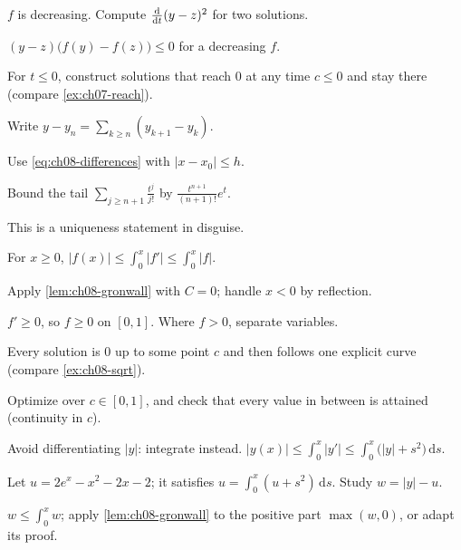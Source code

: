 \begin{hintlevels}
  \item $f$ is decreasing. Compute $\frac{\mathrm{d}}{\mathrm{d}t}(y - z)^2$ for two solutions.
  \item $(y - z)\bigl(f(y) - f(z)\bigr)\le0$ for a decreasing $f$.
  \item For $t\le0$, construct solutions that reach $0$ at any time $c\le 0$
        and stay there (compare \cref{ex:ch07-reach}).
\end{hintlevels}

\begin{hintlevels}
  \item Write $y - y_n = \sum_{k\ge n}(y_{k+1} - y_k)$.
  \item Use \eqref{eq:ch08-differences} with $|x - x_0|\le h$.
  \item Bound the tail $\sum_{j\ge n+1}\frac{t^j}{j!}$ by
        $\frac{t^{n+1}}{(n+1)!}e^t$.
\end{hintlevels}

\begin{hintlevels}
  \item This is a uniqueness statement in disguise.
  \item For $x\ge0$, $|f(x)|\le\int_0^x|f'|\le\int_0^x|f|$.
  \item Apply \cref{lem:ch08-gronwall} with $C = 0$; handle $x<0$ by reflection.
\end{hintlevels}

\begin{hintlevels}
  \item $f'\ge0$, so $f\ge0$ on $[0,1]$. Where $f>0$, separate variables.
  \item Every solution is $0$ up to some point $c$ and then follows one explicit
        curve (compare \cref{ex:ch08-sqrt}).
  \item Optimize over $c\in[0,1]$, and check that every value in between is
        attained (continuity in $c$).
\end{hintlevels}

\begin{hintlevels}
  \item Avoid differentiating $|y|$: integrate instead.
        $|y(x)|\le\int_0^x|y'|\le\int_0^x\bigl(|y| + s^2\bigr)\,\mathrm{d}s$.
  \item Let $u = 2e^x - x^2 - 2x - 2$; it satisfies $u = \int_0^x(u + s^2)\,\mathrm{d}s$.
        Study $w = |y| - u$.
  \item $w\le\int_0^xw$; apply \cref{lem:ch08-gronwall} to the positive part
        $\max(w,0)$, or adapt its proof.
\end{hintlevels}

